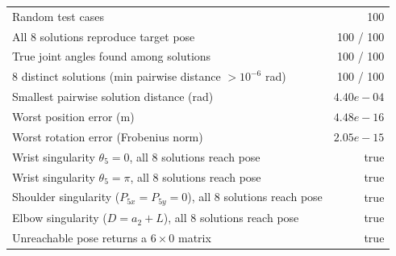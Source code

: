 \begin{tabular}{l r}
\hline
Random test cases & 100 \\
All 8 solutions reproduce target pose & 100 / 100 \\
True joint angles found among solutions & 100 / 100 \\
8 distinct solutions (min pairwise distance $>10^{-6}$ rad) & 100 / 100 \\
Smallest pairwise solution distance (rad) & $4.40e-04$ \\
Worst position error (m) & $4.48e-16$ \\
Worst rotation error (Frobenius norm) & $2.05e-15$ \\
Wrist singularity $\theta_5=0$, all 8 solutions reach pose & true \\
Wrist singularity $\theta_5=\pi$, all 8 solutions reach pose & true \\
Shoulder singularity ($P_{5x}=P_{5y}=0$), all 8 solutions reach pose & true \\
Elbow singularity ($D=a_2+L$), all 8 solutions reach pose & true \\
Unreachable pose returns a $6\times0$ matrix & true \\
\hline
\end{tabular}
